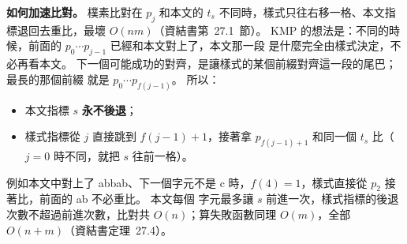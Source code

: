 \begin{pastsoln}
\textbf{如何加速比對。} 樸素比對在 $p_j$ 和本文的 $t_s$ 不同時，樣式只往右移一格、本文指標退回去重比，最壞
$O(nm)$（資結書第~27.1~節）。 KMP 的想法是：不同的時候，前面的 $p_0 \cdots p_{j-1}$ 已經和本文對上了，本文那一段
是什麼完全由樣式決定，不必再看本文。 下一個可能成功的對齊，是讓樣式的某個前綴對齊這一段的尾巴；最長的那個前綴
就是 $p_0 \cdots p_{f(j-1)}$。 所以：
\begin{itemize}
\item 本文指標 $s$ \textbf{永不後退}；
\item 樣式指標從 $j$ 直接跳到 $f(j - 1) + 1$，接著拿 $p_{f(j-1)+1}$ 和同一個 $t_s$ 比（$j = 0$ 時不同，就把 $s$
往前一格）。
\end{itemize}
例如本文中對上了 abbab、下一個字元不是 c 時，$f(4) = 1$，樣式直接從 $p_2$ 接著比，前面的 ab 不必重比。 本文每個
字元最多讓 $s$ 前進一次，樣式指標的後退次數不超過前進次數，比對共 $O(n)$；算失敗函數同理 $O(m)$，全部
$O(n + m)$（資結書定理~27.4）。
\end{pastsoln}

